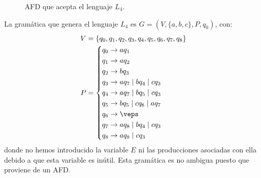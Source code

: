 \begin{ejercicio}
\begin{enumerate}
\begin{figure}
            \caption{AFD que acepta el lenguaje $L_4$.}
            \label{fig:1.4.7.L4.AFD}
        \end{figure}

        La gramática que genera el lenguaje $L_4$ es $G=(V,\{a,b,c\},P,q_0)$, con:
        \begin{equation*}
            \begin{aligned}
                V &= \{ q_0, q_1, q_2, q_3, q_4, q_5, q_6, q_7, q_8 \} \\
                P &= \left\{
                    \begin{aligned}
                        q_0 &\rightarrow aq_1 \\
                        q_1 &\rightarrow aq_2 \\
                        q_2 &\rightarrow bq_3 \\
                        q_3 &\rightarrow aq_7 \mid bq_4 \mid cq_3 \\
                        q_4 &\rightarrow aq_7 \mid bq_5 \mid cq_3 \\
                        q_5 &\rightarrow bq_5 \mid cq_6 \mid aq_7 \\
                        q_6 &\rightarrow \veps \\
                        q_7 &\rightarrow aq_8 \mid bq_4 \mid cq_3\\
                        q_8 &\rightarrow aq_8 \mid cq_3
                    \end{aligned}
                \right.
            \end{aligned}
        \end{equation*}
        donde no hemos introducido la variable $E$ ni las producciones asociadas con ella debido a que esta variable es inútil.
        Esta gramática es no ambigua puesto que proviene de un AFD.
    \end{enumerate}
\end{ejercicio}

